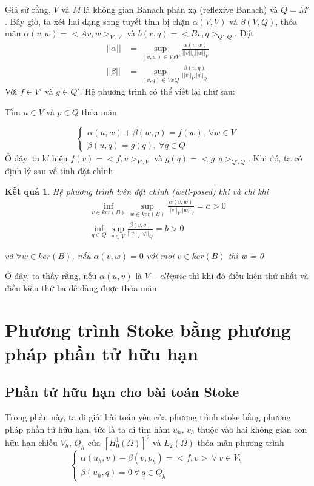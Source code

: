 \documentclass[14pt]{extreport}
\newtheorem{theorem}{\MakeUppercase{K}ết quả}[section]
\begin{document}
{Giả sử rằng, $V$ và $M$ là không gian Banach phản xạ (reflexive Banach) và $Q = M'$. Bây giờ, ta xét hai dạng song tuyết tính bị chặn $\alpha(V, V)$ và $\beta(V, Q)$, thỏa mãn $\alpha(v, w) =  <Av, w>_{V', V}$ và $b(v, q) = <Bv, q>_{Q', Q}$. Đặt
\begin{equation} \label{eq8}
\begin{split}
||\alpha|| & = \sup_{(v, w) \in V x V} \frac{\alpha(v,w)}{||v||_V||w||_V} \\
||\beta|| & = \sup_{(v, q) \in V x Q} \frac{\beta(v,q)}{||v||_V||q||_Q}
\end{split}
\end{equation}
Với $f \in V'$ và $g \in Q'$. Hệ phương trình có thể viết lại như sau:
\begin{center}
Tìm $u \in V$  và $p \in Q$  thỏa mãn
\end{center}
$$
\begin{cases}
\alpha(u, w) + \beta(w,p) = f(w), \ \forall w \in V \\
\beta(u,q) = g(q), \ \forall q \in Q
\end{cases}
$$
Ở đây, ta kí hiệu $f(v) = <f, v>_{V', V}$ và $g(q) = <g,q>_{Q', Q}$.
Khi đó, ta có định lý sau về tính đặt chỉnh
\begin{theorem}
Hệ phương trình trên đặt chỉnh (well-posed) khi và chỉ khi
\begin{equation} \label{eq8}
\begin{split}
\inf_{v \in ker(B)} \sup_{w \in ker(B)} \frac{\alpha(v,w)}{||v||_V||w||_V} = a > 0 \\
\inf_{q \in Q} \sup_{v \in V} \frac{\beta(v, q)}{||v||_V||q||_Q} = b > 0
\end{split}
\end{equation}
\begin{center}
và $\forall w \in ker(B)$, nếu $\alpha(v, w) = 0$ với mọi $v \in ker(B)$ thì w = 0
\end{center}
\end{theorem}

Ở đây, ta thấy rằng, nếu $\alpha(u, v)$ là $V-elliptic$ thì khí đó điều kiện thứ nhất và điều kiện thứ ba dễ dàng được thỏa mãn
\chapter{Phương trình Stoke bằng phương pháp phần tử hữu hạn}
\section{Phần tử hữu hạn cho bài toán Stoke}
Trong phần này, ta đi giải bài toán yếu của phương trình stoke bằng phương pháp phần tử hữu hạn, tức là ta đi tìm hàm $u_h$, $v_h$ thuộc vào hai không gian con hữu hạn chiều $V_h$, $Q_h$ của $[ H_0^1(\Omega) ]^2$ và $L_2(\Omega)$ thỏa mãn phương trình
$$
\begin{cases}
\alpha(u_h,v) - \beta(v, p_h) = <f, v> \ \forall \ v \in V_h \\
\beta(u_h, q) = 0 \ \forall \ q \in Q_h
\end{cases}
$$

}
\end{document}
